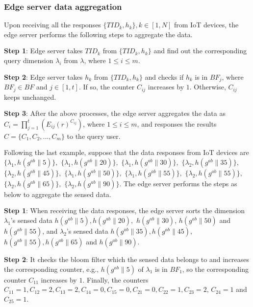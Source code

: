 \documentclass[IEEE JOURNAL OF BIOMEDICAL AND HEALTH INFORMATICS]{IEEEtran}
\begin{document}
\subsubsection{Edge server data aggregation}
Upon receiving all the responses $\{TID_k, h_k\}, k\in [1, N]$ from IoT devices, the edge server performs the following steps to aggregate the data.

\textbf{Step 1}: Edge server takes $TID_k$ from $\{TID_k, h_k\}$ and find out the corresponding query dimension $\lambda_i$ from $\lambda$, where $1\le i \le m$.  

\textbf{Step 2}: Edge server takes $h_k$ from $\{TID_k, h_k\}$ and checks if $h_k$ is in $BF_j$, where $BF_j \in BF$ and $j \in [1, t]$. If so, the counter $C_{ij}$ increases by $1$. Otherwise, $C_{ij}$ keeps unchanged.

\textbf{Step 3}: After the above processes, the edge server aggregates the data as $C_i = \prod_{j=1}^{t}(E_{ij}(r)^{C_{ij}})$, where $1\le i \le m$, and responses the results $C=\{C_1, C_2, ... ,C_m\}$ to the query user.


  Following the last example, suppose that the data responses from IoT devices are $\{\lambda_1,h(g^{ab}\|5)\},$ $ \{\lambda_1, h(g^{ab}\|20)\},$ $ \{\lambda_1, h(g^{ab}\|30)\},$ $ \{\lambda_2, h(g^{ab}\|35)\},$ $ \{\lambda_2, h(g^{ab}\|45)\}, $ $ \{\lambda_1, h(g^{ab}\|50)\}, $ $ \{\lambda_1, h(g^{ab}\|55)\},$ $ \{\lambda_2, h(g^{ab}\|55)\}, $ $ \{\lambda_2, h(g^{ab}\|65)\}, $ $ \{\lambda_2, h(g^{ab}\|90)\}$. The edge server performs the steps as below to aggregate the sensed data.
   
  \textbf{Step 1}: When receiving the data responses, the edge server sorts the dimension $\lambda_1$'s sensed data $h(g^{ab}\|5), h(g^{ab}\|20),$ $ h(g^{ab}\|30)$, $h(g^{ab}\|50)$ and $h(g^{ab}\|55)$, and $\lambda_2$'s sensed data $h(g^{ab}\|35), h(g^{ab}\|45),$ $ h(g^{ab}\|55), h(g^{ab}\|65)$ and $h(g^{ab}\|90)$. 
  
  \textbf{Step 2}: It checks the bloom filter which the sensed data belongs to and increases the corresponding counter, e.g., $h(g^{ab}\|5)$ of $\lambda_1$ is in $BF_1$, so the corresponding counter $C_{11}$ increases by $1$. Finally, the counters $C_{11}=1, C_{12}=2, C_{13}=2,C_{14}=0, C_{15}=0, C_{21}=0, C_{22}=1, C_{23}=2$, $C_{24}=1$ and $C_{25}=1$.
  
\end{document}
